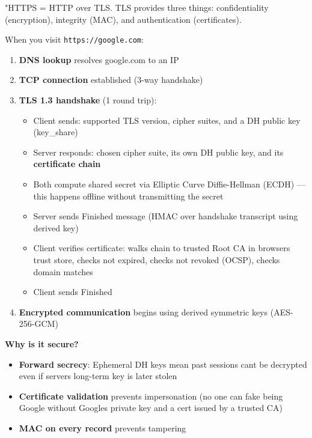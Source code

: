 \documentclass[11pt]{article}
\providecommand{\tightlist}{\setlength{\itemsep}{1pt}\setlength{\parskip}{0pt}}
\begin{document}
"HTTPS = HTTP over TLS. TLS provides three things: confidentiality (encryption), integrity (MAC), and authentication (certificates).

When you visit \texttt{https://google.com}:

\begin{enumerate}
\def\labelenumi{\arabic{enumi}.}
\tightlist
\item
  \textbf{DNS lookup} resolves google.com to an IP
\item
  \textbf{TCP connection} established (3-way handshake)
\item
  \textbf{TLS 1.3 handshake} (1 round trip):

  \begin{itemize}
  \tightlist
  \item
    Client sends: supported TLS version, cipher suites, and a DH public key (key\_share)
  \item
    Server responds: chosen cipher suite, its own DH public key, and its \textbf{certificate chain}
  \item
    Both compute shared secret via Elliptic Curve Diffie-Hellman (ECDH) --- this happens offline without transmitting the secret
  \item
    Server sends Finished message (HMAC over handshake transcript using derived key)
  \item
    Client verifies certificate: walks chain to trusted Root CA in browser\textquotesingle s trust store, checks not expired, checks not revoked (OCSP), checks domain matches
  \item
    Client sends Finished
  \end{itemize}
\item
  \textbf{Encrypted communication} begins using derived symmetric keys (AES-256-GCM)
\end{enumerate}

\textbf{Why is it secure?}

\begin{itemize}
\tightlist
\item
  \textbf{Forward secrecy}: Ephemeral DH keys mean past sessions can\textquotesingle t be decrypted even if server\textquotesingle s long-term key is later stolen
\item
  \textbf{Certificate validation} prevents impersonation (no one can fake being Google without Google\textquotesingle s private key and a cert issued by a trusted CA)
\item
  \textbf{MAC on every record} prevents tampering
\end{itemize}
\end{document}
